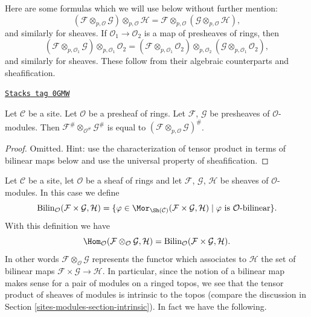 \medskip\noindent
Here are some formulas which we will use below without further mention:
$$
(\mathcal{F}
\otimes_{p, \mathcal{O}} \mathcal{G})
\otimes_{p, \mathcal{O}} \mathcal{H}
=
\mathcal{F}
\otimes_{p, \mathcal{O}} (\mathcal{G}
\otimes_{p, \mathcal{O}} \mathcal{H}),
$$
and similarly for sheaves.
If $\mathcal{O}_1 \to \mathcal{O}_2$ is a map of presheaves of rings,
then
$$
(\mathcal{F} \otimes_{p, \mathcal{O}_1} \mathcal{G})
\otimes_{p, \mathcal{O}_1} \mathcal{O}_2 =
(\mathcal{F} \otimes_{p, \mathcal{O}_1} \mathcal{O}_2)
\otimes_{p, \mathcal{O}_2}
(\mathcal{G} \otimes_{p, \mathcal{O}_1} \mathcal{O}_2),
$$
and similarly for sheaves.
These follow from their algebraic counterparts and sheafification.

\begin{lemma}
\label{sites-modules-lemma-sheafification-tensor}
\href{https://stacks.math.columbia.edu/tag/0GMW}{\texttt{Stacks tag 0GMW}}

Let $\mathcal{C}$ be a site. Let $\mathcal{O}$ be a presheaf of rings.
Let $\mathcal{F}$, $\mathcal{G}$ be presheaves of $\mathcal{O}$-modules.
Then
$\mathcal{F}^\# \otimes_{\mathcal{O}^\#} \mathcal{G}^\#$
is equal to
$(\mathcal{F} \otimes_{p, \mathcal{O}} \mathcal{G})^\#$.
\end{lemma}

\begin{proof}
Omitted. Hint: use the characterization of tensor product in terms
of bilinear maps below and use the universal property of sheafification.
\end{proof}

Let $\mathcal{C}$ be a site, let $\mathcal{O}$ be a sheaf of rings and let
$\mathcal{F}$, $\mathcal{G}$, $\mathcal{H}$ be sheaves of
$\mathcal{O}$-modules. In this case we define
$$
\text{Bilin}_\mathcal{O}(\mathcal{F} \times \mathcal{G}, \mathcal{H})
=
\{\varphi \in
\Mor_{\Sh(\mathcal{C})}(
\mathcal{F} \times \mathcal{G}, \mathcal{H}) \mid
\varphi \text{ is }\mathcal{O}\text{-bilinear}\}.
$$
With this definition we have
$$
\Hom_\mathcal{O}
(\mathcal{F} \otimes_\mathcal{O} \mathcal{G}, \mathcal{H})
=
\text{Bilin}_\mathcal{O}(\mathcal{F} \times \mathcal{G}, \mathcal{H}).
$$
In other words $\mathcal{F} \otimes_\mathcal{O} \mathcal{G}$
represents the functor which associates to $\mathcal{H}$ the set
of bilinear maps $\mathcal{F} \times \mathcal{G} \to \mathcal{H}$.
In particular, since the notion of a bilinear map makes sense for
a pair of modules on a ringed topos, we see that the tensor
product of sheaves of modules is intrinsic to the topos (compare
the discussion in Section \ref{sites-modules-section-intrinsic}). In fact we
have the following.

